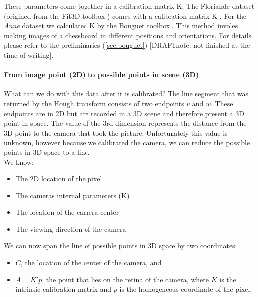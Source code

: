 	These parameters come together in a calibration matrix K.  The Floriande
	dataset (origined from the Fit3D toolbox \cite{Fit3d}) comes with a
	calibration matrix K .  For
	the \emph{Anne} dataset we calculated K by the Bouguet toolbox
	\cite{bouguet}.
	This method involes making images of a chessboard in
	different positions and orientations. For details please refer to the
	preliminaries (\ref{sec:bouguet}) [DRAFTnote: not finished at the
	time of writing].

	 
	\paragraph{From image point (2D) to possible points in scene (3D)} 
	What can we do with this data after it is calibrated?
	The line segment that was returned by the Hough transform consists of two
	endpoints $v$ and $w$. These endpoints are in 2D but are recorded in a 3D
	scene and therefore present a 3D point in space.  The value of the 3rd
	dimension represents the distance from the 3D point to the camera that took
	the picture. Unfortunately this value is unknown, however because we
	calibrated the camera, we can reduce the possible points in 3D space to a
	line.\\

	We know:
	\begin{itemize}
		\item The 2D location of the pixel
		\item The cameras internal parameters (K) 
		\item The location of the camera center
		\item The viewing direction of the camera
	\end{itemize}


	We can now span the line of possible points in 3D space by two coordinates:\\
	\begin{itemize}
		\item $C$, the location of the center of the camera, and
		\item $A = K'p$, the point that lies on the retina of the camera, where
		$K$ is the intrinsic calibration matrix and $p$ is the homogeneous
		coordinate of the pixel.
	\end{itemize}



